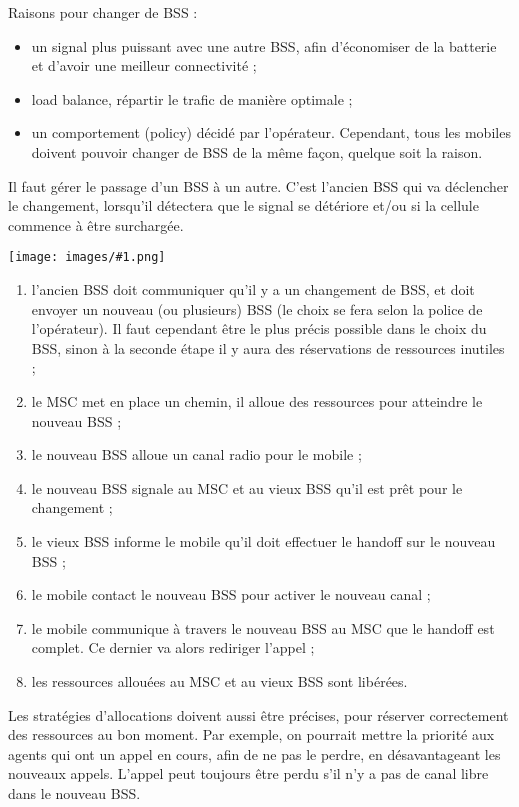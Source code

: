 \documentclass[10pt,a4paper]{report}
\newcommand{\dessinS}[2]{\begin{center}\texttt{[image: images/\#1.png]}\end{center}}
\begin{document}
	Raisons pour changer de BSS :
	
	\begin{itemize}
		\item un signal plus puissant avec une autre BSS, afin d'économiser de la batterie et d'avoir une meilleur connectivité ;
		\item load balance, répartir le trafic de manière optimale ;
		\item un comportement (policy) décidé par l'opérateur. Cependant, tous les mobiles doivent pouvoir changer de BSS de la même façon, quelque soit la raison.
	\end{itemize}
	
	Il faut gérer le passage d'un BSS à un autre. C'est l'ancien BSS qui va déclencher le changement, lorsqu'il détectera que le signal se détériore et/ou si la cellule commence à être surchargée.
	
	\dessinS{60}{.85}
	
	\begin{enumerate}
		\item l'ancien BSS doit communiquer qu'il y a un changement de BSS, et doit envoyer un nouveau (ou plusieurs) BSS (le choix se fera selon la police de l'opérateur). Il faut cependant être le plus précis possible dans le choix du BSS, sinon à la seconde étape il y aura des réservations de ressources inutiles ;
		\item le MSC met en place un chemin, il alloue des ressources pour atteindre le nouveau BSS ;
		\item le nouveau BSS alloue un canal radio pour le mobile ;
		\item le nouveau BSS signale au MSC et au vieux BSS qu'il est prêt pour le changement ;
		\item le vieux BSS informe le mobile qu'il doit effectuer le handoff sur le nouveau BSS ;
		\item le mobile contact le nouveau BSS pour activer le nouveau canal ;
		\item le mobile communique à travers le nouveau BSS au MSC que le handoff est complet. Ce dernier va alors rediriger l'appel ;
		\item les ressources allouées au MSC et au vieux BSS sont libérées.
	\end{enumerate}	
	
	Les stratégies d'allocations doivent aussi être précises, pour réserver correctement des ressources au bon moment. Par exemple, on pourrait mettre la priorité aux agents qui ont un appel en cours, afin de ne pas le perdre, en désavantageant les nouveaux appels. L'appel peut toujours être perdu s'il n'y a pas de canal libre dans le nouveau BSS.
		
\end{document}
